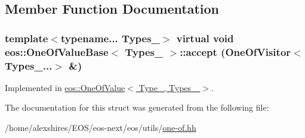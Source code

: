 \subsection{Member Function Documentation}
\hypertarget{structeos_1_1OneOfValueBase_ad591bb797392ce70f45001d92d6c95bc}{
\subsubsection[{accept}]{\setlength{\rightskip}{0pt plus 5cm}template$<$typename... Types\_\-$>$ virtual void {\bf eos::OneOfValueBase}$<$ Types\_\- $>$::accept ({\bf OneOfVisitor}$<$ Types\_\-...$>$ \&)}}
\label{structeos_1_1OneOfValueBase_ad591bb797392ce70f45001d92d6c95bc}


Implemented in \hyperlink{structeos_1_1OneOfValue_a280c84a5d3ea4f659297217e7b95a3c2}{eos::OneOfValue$<$ Type\_\-, Types\_\- $>$}.

The documentation for this struct was generated from the following file:\begin{DoxyCompactItemize}
\item 
/home/alexshires/EOS/eos-\/next/eos/utils/\hyperlink{one-of_8hh}{one-\/of.hh}\end{DoxyCompactItemize}

